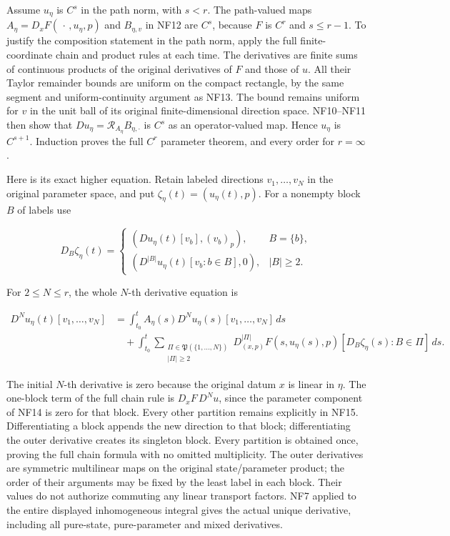 \documentclass[
  11pt,
]{article}
\begin{document}
Assume \(u_\eta\) is \(C^s\) in the path norm, with \(s<r\). The
path-valued maps \(A_\eta=D_xF(\,\cdot\,,u_\eta,p)\) and \(B_{\eta,v}\)
in NF12 are \(C^s\), because \(F\) is \(C^r\) and \(s\leq r-1\). To
justify the composition statement in the path norm, apply the full
finite-coordinate chain and product rules at each time. The derivatives
are finite sums of continuous products of the original derivatives of
\(F\) and those of \(u\). All their Taylor remainder bounds are uniform
on the compact rectangle, by the same segment and uniform-continuity
argument as NF13. The bound remains uniform for \(v\) in the unit ball
of its original finite-dimensional direction space. NF10--NF11 then show
that \(Du_\eta=\mathcal R_{A_\eta}B_{\eta,\cdot}\) is \(C^s\) as an
operator-valued map. Hence \(u_\eta\) is \(C^{s+1}\). Induction proves
the full \(C^r\) parameter theorem, and every order for \(r=\infty\).

Here is its exact higher equation. Retain labeled directions
\(v_1,\ldots,v_N\) in the original parameter space, and put
\(\zeta_\eta(t)=(u_\eta(t),p)\). For a nonempty block \(B\) of labels
use

\[
 D_B\zeta_\eta(t)=
 \begin{cases}
 (D u_\eta(t)[v_b],(v_b)_p),&B=\{b\},\\
 (D^{|B|}u_\eta(t)[v_b:b\in B],0),&|B|\geq2.
 \end{cases}
 \tag{NF14}
\]

For \(2\leq N\leq r\), the whole \(N\)-th derivative equation is

\[
 \begin{aligned}
 D^Nu_\eta(t)[v_1,\ldots,v_N]
 &=\int_{t_0}^t A_\eta(s)
                  D^Nu_\eta(s)[v_1,\ldots,v_N]\,ds\\
 &\quad+\int_{t_0}^t
   \sum_{\substack{\Pi\in\mathfrak P(\{1,\ldots,N\})\\|\Pi|\geq2}}
   D_{(x,p)}^{|\Pi|}F(s,u_\eta(s),p)
                 [D_B\zeta_\eta(s):B\in\Pi]\,ds .
 \end{aligned}
 \tag{NF15}
\]

The initial \(N\)-th derivative is zero because the original datum \(x\)
is linear in \(\eta\). The one-block term of the full chain rule is
\(D_xF\,D^Nu\), since the parameter component of NF14 is zero for that
block. Every other partition remains explicitly in NF15. Differentiating
a block appends the new direction to that block; differentiating the
outer derivative creates its singleton block. Every partition is
obtained once, proving the full chain formula with no omitted
multiplicity. The outer derivatives are symmetric multilinear maps on
the original state/parameter product; the order of their arguments may
be fixed by the least label in each block. Their values do not authorize
commuting any linear transport factors. NF7 applied to the entire
displayed inhomogeneous integral gives the actual unique derivative,
including all pure-state, pure-parameter and mixed derivatives.
\end{document}
